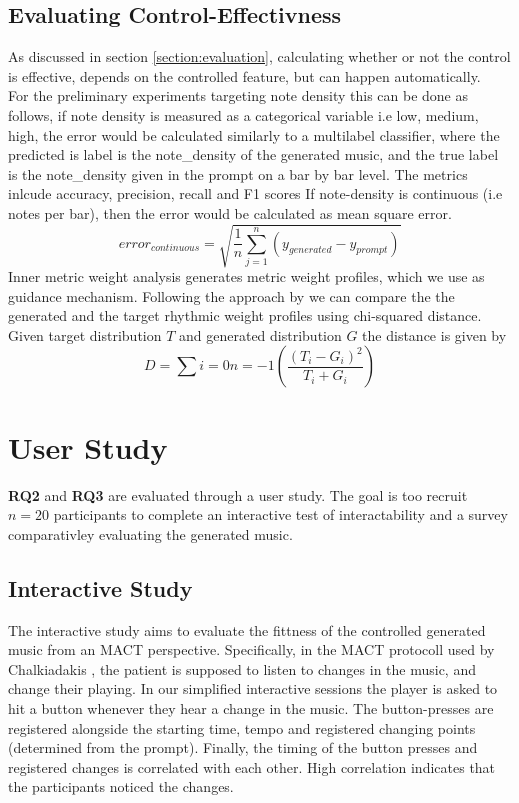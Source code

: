 \subsection{Evaluating Control-Effectivness}
As discussed in section \ref{section:evaluation}, calculating whether or not the control is effective, depends on the controlled feature, but can happen automatically. \\
For the preliminary experiments targeting note density this can be done as follows, if note density is measured as a categorical variable i.e low, medium, high, the error would be calculated similarly to a multilabel classifier, where the predicted is label is the note_density of the generated music, and the true label is the note_density given in the prompt on a bar by bar level. The metrics inlcude accuracy, precision, recall and F1 scores If note-density is continuous (i.e notes per bar), then the error would be calculated as mean square error. \\
\[
error_{continuous} = \sqrt{\frac{1}{n}\sum_{j=1}^{n}(y_{generated}-y_{prompt})}
\]
Inner metric weight analysis generates metric weight profiles, which we use as guidance mechanism. Following the approach by \cite{Bemman2024} we can compare the the generated and the target rhythmic weight profiles using chi-squared distance.
Given target distribution $T$ and generated distribution $G$ the distance is given by 
\[
D=\sum{i=0}{n=-1}(\frac{(T_i-G_i)^2}{T_i+G_i})
\]

\section{User Study}
\textbf{RQ2} and \textbf{RQ3} are evaluated through a user study. The goal is too recruit $n=20$ participants to complete an interactive test of interactability and a survey comparativley evaluating the generated music. 
\subsection{Interactive Study}
The interactive study aims to evaluate the fittness of the controlled generated music from an MACT perspective. Specifically, in the MACT protocoll used by Chalkiadakis \cite{Chalkiadakis_2022}, the patient is supposed to listen to changes in the music, and change their playing. In our simplified interactive sessions the player is asked to hit a button whenever they hear a change in the music. The button-presses are registered alongside the starting time, tempo and registered changing points (determined from the prompt). Finally, the timing of the button presses and registered changes is correlated with each other. High correlation indicates that the participants noticed the changes. 

